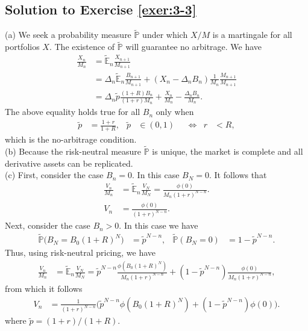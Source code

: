\documentclass[12pt]{book}
\let\varphi\phi
\numberwithin{equation}{chapter}
\theoremstyle{plain}
\numberwithin{theorem}{section}
\theoremstyle{definition}
\numberwithin{exercise}{chapter}
\newcommand{\<}{\langle}
\renewcommand{\>}{\rangle}
\renewcommand{\(}{\left(}
\renewcommand{\)}{\right)}
\renewcommand{\[}{\left[}
\renewcommand{\]}{\right]}
\newcommand\Eb{\mathds{E}}
\newcommand\Pb{\mathds{P}}
\newcommand\Del{\Delta}
\newcommand\Ebt{\widetilde{\Eb}}
\newcommand\Pbt{\widetilde{\Pb}}
\theoremstyle{definition}
\numberwithin{question}{section}
\newcommand\pt{\widetilde{p}}
\begin{document}
\subsection*{Solution to Exercise \ref{exer:3-3}}
(a)
We seek a probability measure $\Pbt$ under which $X/M$ is a martingale for all portfolios $X$.  The existence of {$\Pbt$} will {guarantee} no arbitrage. We have
\begin{align}
\frac{X_n}{M_n}
	&=	\Ebt_n \frac{X_{n+1}}{M_{n+1}} \\
	&=	\Del_n \Ebt_n \frac{B_{n+1}}{M_{n+1}} + ( X_n - \Del_n B_n) \frac{1}{M_n} \frac{M_{n+1}}{M_{n+1}} \\
	&=	\Del_n \pt \frac{(1+R) B_n}{(1+r)M_n} + \frac{X_n}{M_n} - \frac{\Del_n B_n}{M_n} .
\end{align}
The above equality holds true for all $B_n$ only when 
\begin{align}
\pt 
	&= \frac{1+r}{1+R} , &
\pt
	&\in (0,1) &
	&\Leftrightarrow&
r 
	&< R ,
\end{align}
which is the no-arbitrage condition.\\
(b) Because the risk-neutral measure $\Pbt$ is unique, the market is complete and all derivative assets can be replicated.\\
(c) First, consider the case $B_n = 0$.  In this case $B_N = 0$.  It follows that
\begin{align}
\frac{V_n}{M_n}
	&=	\Ebt_n \frac{V_N}{M_N}
	=		\frac{\varphi(0)}{M_n(1+r)^{N-n}} . \\
V_n
	&=	\frac{\varphi(0)}{(1+r)^{N-n}} .
\end{align}
Next, consider the case $B_n > 0$.  In this case we have
\begin{align}
\Pbt \big( B_N = B_0 (1+R)^N \big)
	&=	\pt^{N-n} , &
\Pbt ( B_N = 0 )
	&=	1 - \pt^{N-n} .
\end{align}
Thus, using risk-neutral pricing, we have
\begin{align}
\frac{V_n}{M_n}
	&=	\Ebt_n \frac{V_N}{M_N}
	=		\pt^{N-n} \frac{\varphi(B_0(1+R)^{N})}{M_n(1+r)^{N-n}} + (1 - \pt^{N-n} ) \frac{\varphi(0)}{M_n(1+r)^{N-n}} ,
\end{align}
from which it follows
\begin{align}
V_n
	&=	\frac{1}{(1+r)^{N-n}} \Big( \pt^{N-n} \varphi(B_0(1+R)^{N}) + (1 - \pt^{N-n} ) \varphi(0) \Big) .
\end{align}
where $\pt = (1+r)/(1+R)$.\\
\end{document}
